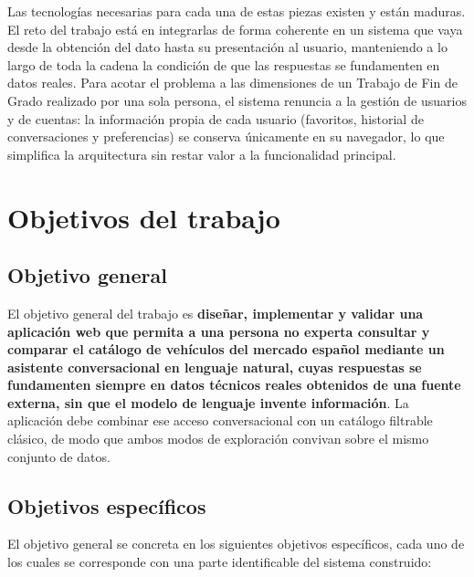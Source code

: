 Las tecnologías necesarias para cada una de estas piezas existen y están maduras.
El reto del trabajo está en integrarlas de forma coherente en un sistema que vaya
desde la obtención del dato hasta su presentación al usuario, manteniendo a lo
largo de toda la cadena la condición de que las respuestas se fundamenten en datos
reales. Para acotar el problema a las dimensiones de un Trabajo de Fin de Grado
realizado por una sola persona, el sistema renuncia a la gestión de usuarios y de
cuentas: la información propia de cada usuario (favoritos, historial de
conversaciones y preferencias) se conserva únicamente en su navegador, lo que
simplifica la arquitectura sin restar valor a la funcionalidad principal.

\section{Objetivos del trabajo}
\label{sec:intro-objetivos}

\subsection{Objetivo general}
\label{sec:intro-objetivo-general}

El objetivo general del trabajo es \textbf{diseñar, implementar y validar una
aplicación web que permita a una persona no experta consultar y comparar el
catálogo de vehículos del mercado español mediante un asistente conversacional en
lenguaje natural, cuyas respuestas se fundamenten siempre en datos técnicos
reales obtenidos de una fuente externa, sin que el modelo de lenguaje invente
información}. La aplicación debe combinar ese acceso conversacional con un
catálogo filtrable clásico, de modo que ambos modos de exploración convivan sobre
el mismo conjunto de datos.

\subsection{Objetivos específicos}
\label{sec:intro-objetivos-especificos}

El objetivo general se concreta en los siguientes objetivos específicos, cada uno
de los cuales se corresponde con una parte identificable del sistema construido:

